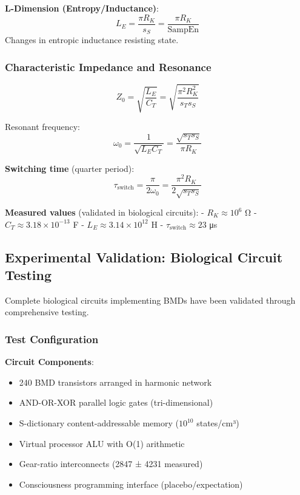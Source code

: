\documentclass[11pt,onecolumn]{article}
\begin{document}
\textbf{L-Dimension (Entropy/Inductance)}:
\begin{equation}
L_E = \frac{\pi R_K}{s_S} = \frac{\pi R_K}{\text{SampEn}}
\end{equation}
Changes in entropic inductance resisting state.

\subsubsection{Characteristic Impedance and Resonance}

\begin{equation}
Z_0 = \sqrt{\frac{L_E}{C_T}} = \sqrt{\frac{\pi^2 R_K^2}{s_T s_S}}
\end{equation}

Resonant frequency:
\begin{equation}
\omega_0 = \frac{1}{\sqrt{L_E C_T}} = \frac{\sqrt{s_T s_S}}{\pi R_K}
\end{equation}

\textbf{Switching time} (quarter period):
\begin{equation}
\tau_{\text{switch}} = \frac{\pi}{2\omega_0} = \frac{\pi^2 R_K}{2\sqrt{s_T s_S}}
\end{equation}

\textbf{Measured values} (validated in biological circuits):
- $R_K \approx 10^6$ Ω
- $C_T \approx 3.18 \times 10^{-13}$ F  
- $L_E \approx 3.14 \times 10^{12}$ H
- $\tau_{\text{switch}} \approx 23$ μs

\subsection{Experimental Validation: Biological Circuit Testing}

Complete biological circuits implementing BMDs have been validated through comprehensive testing.

\subsubsection{Test Configuration}

\textbf{Circuit Components}:
\begin{itemize}
\item 240 BMD transistors arranged in harmonic network
\item AND-OR-XOR parallel logic gates (tri-dimensional)
\item S-dictionary content-addressable memory ($10^{10}$ states/cm³)
\item Virtual processor ALU with O(1) arithmetic
\item Gear-ratio interconnects (2847 ± 4231 measured)
\item Consciousness programming interface (placebo/expectation)
\end{itemize}
\end{document}
